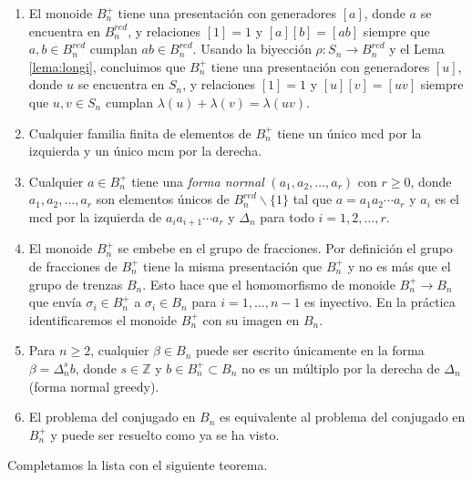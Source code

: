 \documentclass[12pt]{book}
\theoremstyle{definition}
\begin{document}
\begin{enumerate}[label=(\arabic*)]
\item El monoide $B_n^+$ tiene una presentación con generadores $[a]$, donde $a$ se encuentra en $B_n^{red}$, y relaciones $[1]=1$ y $[a][b]=[ab]$ siempre que $a,b\in B_n^{red}$ cumplan $ab\in B_n^{red}$. Usando la biyección $\rho: S_n\rightarrow B_n^{red}$ y el Lema \ref{lema:longi}, concluimos que $B_n^+$ tiene una presentación con generadores $[u]$, donde $u$ se encuentra en $S_n$, y relaciones $[1]=1$ y $[u][v]=[uv]$ siempre que $u,v\in S_n$ cumplan $\lambda(u)+\lambda(v)=\lambda(uv)$.
\item Cualquier familia finita de elementos de $B_n^+$ tiene un único mcd por la izquierda y un único mcm por la derecha.
\item Cualquier $a\in B_n^+$ tiene una \textit{forma normal} $(a_1,a_2,\ldots, a_r)$ con $r\geq 0$, donde $a_1,a_2,\ldots, a_r$ son elementos únicos de $B_n^{red}\backslash\{1\}$ tal que $a=a_1a_2\cdots a_r$ y $a_i$ es el mcd por la izquierda de $a_ia_{i+1}\cdots a_r$ y $\Delta_n$ para todo $i=1,2,\ldots,r$.
\item El monoide $B_n^+$ se embebe en el grupo de fracciones. Por definición el grupo de fracciones de $B_n^+$ tiene la misma presentación que $B_n^+$ y no es más que el grupo de trenzas $B_n$. Esto hace que el homomorfismo de monoide $B_n^+\rightarrow B_n$ que envía $\sigma_i\in B_n^+$ a $\sigma_i\in B_n$ para $i=1,\ldots, n-1$ es inyectivo. En la práctica identificaremos el monoide $B_n^+$ con su imagen en $B_n$.
\item Para $n\geq 2$, cualquier $\beta\in B_n$ puede ser escrito únicamente en la forma $\beta=\Delta_n^sb$, donde $s\in\mathbb{Z}$ y $b\in B_n^+\subset B_n$ no es un múltiplo por la derecha de $\Delta_n$ (forma normal greedy).
\item El problema del conjugado en $B_n$ es equivalente al problema del conjugado en $B_n^+$ y puede ser resuelto como ya se ha visto.
\end{enumerate}

Completamos la lista con el siguiente teorema.
\end{document}
